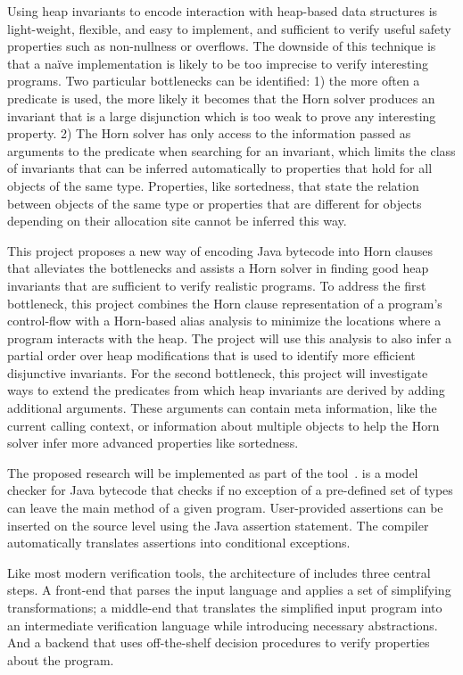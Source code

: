 Using heap invariants to encode interaction with heap-based data 
structures is light-weight, flexible, and
easy to implement, and sufficient to verify useful safety properties
such as non-nullness or overflows. The downside of this technique is that a na\"ive 
implementation is
likely to be too imprecise to verify interesting programs. Two particular
bottlenecks can be identified: 1) the more often a predicate is used, the
more likely it becomes that the Horn solver produces an invariant that
is a large disjunction which is too weak 
 to prove any interesting property. 2) The Horn solver has only access to the information passed as
arguments to the predicate when searching for an invariant, which limits 
the class of invariants that can be inferred automatically to properties
that hold for all objects of the same type. Properties, like sortedness,
that state the relation between objects of the same type or properties
that are different for objects depending on their allocation site 
cannot be inferred this way.

This project proposes a new way of encoding Java bytecode into Horn clauses
that alleviates the bottlenecks and assists a Horn solver 
in finding good heap invariants that are sufficient
to verify realistic programs. To address the first bottleneck, 
this project combines the Horn clause 
representation of a program's control-flow with a Horn-based alias analysis 
to minimize the locations where a program interacts with the heap. 
The project will use this analysis to also infer a partial order over heap modifications that
is used to identify more efficient disjunctive invariants. For the second
bottleneck, this project will investigate ways to extend the predicates from
which heap invariants are derived by adding additional arguments. These
arguments can contain meta information, like the current calling context,
or information about multiple objects to help the Horn solver infer
more advanced properties like sortedness.


The proposed research will be implemented as
 part of the \jayhorn tool~\cite{jayhorn16}. \jayhorn is a model checker for Java 
bytecode that checks if no exception of a pre-defined set of types can leave the main 
method of a given program. User-provided assertions can be inserted on the source level
using the Java assertion statement. The compiler automatically translates assertions into conditional
exceptions.


Like most modern verification tools, the architecture of \jayhorn includes three 
central steps. A front-end that parses the input language and applies a set of 
simplifying transformations; a middle-end that translates the simplified input
program into an intermediate verification language while introducing necessary
abstractions. And a backend that uses off-the-shelf decision procedures to verify
properties about the program.

